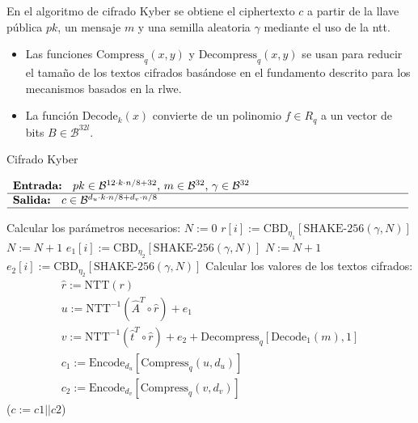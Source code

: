 En el algoritmo de cifrado Kyber se obtiene el ciphertexto \(c\) a partir de la llave pública \(pk\), un mensaje \(m\) y una semilla aleatoria \(\gamma\) mediante el uso de la \gls{ntt}.
\begin{itemize}
	\item Las funciones $\text{Compress}_q(x,y)$ y $\text{Decompress}_q(x,y)$ se usan para reducir el tamaño de los textos cifrados basándose en el fundamento descrito para los mecanismos basados en la \gls{rlwe}. 
	\item La función $\text{Decode}_k(x)$  convierte de un polinomio \(f\in R_q\) a un vector de bits \(B\in\mathcal{B}^{32l}\).
\end{itemize}
\newpage
\begin{algorithm}[H]
	\caption{Cifrado Kyber}
	$\begin{array}{p{\textwidth}}
		\textbf{Entrada: } \(pk\in \mathcal{B}^{12\cdot k\cdot n/8+32}\), \(m\in \mathcal{B}^{32}\), \(\gamma\in \mathcal{B}^{32}\)\\ 
		\hline
		\textbf{Salida: } \(c\in \mathcal{B}^{d_u\cdot k\cdot n/8+d_v\cdot n/8}\)\\ 
		\hline
	\end{array}$
	\begin{algorithmic}[1]
		\State Calcular los parámetros necesarios:
		\State \(N:=0\)
		\State $r[i]:= \text{CBD}_{\eta_1}[\text{SHAKE-256}(\gamma,N)]$ 
		\State $N:= N+1$
		\EndFor
		\State $e_1[i]:= \text{CBD}_{\eta_2}[\text{SHAKE-256}(\gamma,N)]$ 
		\State $N:= N+1$
		\EndFor
		\State \(e_2[i]:= \text{CBD}_{\eta_2}[\text{SHAKE-256}(\gamma,N)]\) 
		\State Calcular los valores de los textos cifrados:
		\begin{equation}
			\begin{array}{l}
				\hat{r}:=\text{NTT}(r)\\
				u:= \text{NTT}^{-1}(\hat{A}^T\circ \hat{r})+e_1\\
				v:=\text{NTT}^{-1}(\hat{t}^T\circ \hat{r})+e_2+ \text{Decompress}_q[\text{Decode}_1(m),1]\\
				c_1:=\text{Encode}_{d_u}[\text{Compress}_q(u,d_u)]\\
				c_2:=\text{Encode}_{d_v}[\text{Compress}_q(v,d_v)]
			\end{array}
		\end{equation}
		\State \Return (\(c:=c1||c2\))
	\end{algorithmic}
\end{algorithm}



